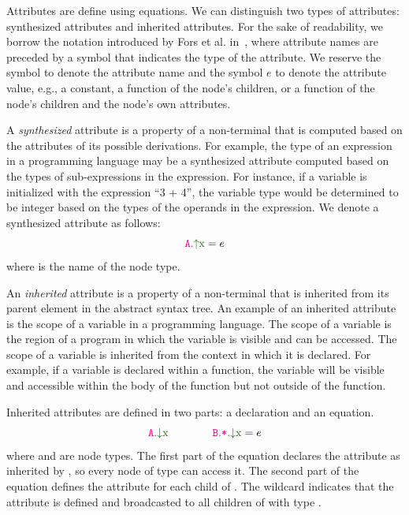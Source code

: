 Attributes are define using equations. We can distinguish two types of
attributes: synthesized attributes and inherited attributes.
For the sake of readability, we borrow the notation introduced by Fors et al. in~\cite{fors2020patterns},
where attribute names are preceded by a symbol that indicates the type of the attribute.
We reserve the symbol  to denote the attribute name and the symbol $e$ to denote the attribute value,
e.g., a constant, a function of the node's children, or a function of the node's children
and the node's own attributes.

A \emph{synthesized} attribute is a property of a non-terminal that is computed
based on the attributes of its possible derivations. For example, the type of an expression
in a programming language may be a synthesized attribute computed based
on the types of sub-expressions in the expression. For instance, if a variable is initialized
with the expression ``3 + 4'', the variable type would be determined to
be integer based on the types of the operands in the expression.
We denote a synthesized attribute as follows:
\begin{equation*}
  \Asyn{A}{x} = e
  \end{equation*}
where  is the name of the node type.

An \emph{inherited} attribute is a property of a non-terminal that is inherited from
its parent element in the abstract syntax tree.
An example of an inherited attribute is the scope of a variable in a programming
language. The scope of a variable is the region of a program in which the variable
is visible and can be accessed. The scope of a variable is inherited from the
context in which it is declared. For example, if a variable is declared within a
function, the variable will be visible and accessible within the body of the function
but not outside of the function.


Inherited attributes are defined in two parts: a declaration and an equation.
\begin{equation*}
\Ainh{A}{x} \quad\quad \quad\quad \Ainhdef{B}{*}{x} = e
\end{equation*}
where  and  are node types.
The first part of the equation declares the attribute  as inherited by ,
so every node of type   can access it. The second part of the
equation defines the attribute for each child of . The wildcard \astnode{*}
indicates that the attribute is defined and broadcasted to all children of  with type .

